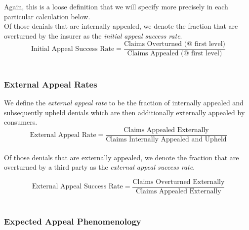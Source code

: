 \documentclass[psamsfonts]{amsart}
\theoremstyle{plain}
\theoremstyle{definition}
\theoremstyle{remark}
\begin{document}
Again, this is a loose definition that we will specify more precisely in each particular calculation below.\\

Of those denials that are internally appealed, we denote the fraction that are overturned by the insurer as the \emph{initial appeal success rate}.\\
	
\begin{equation*}
	\text{Initial Appeal Success Rate} = \dfrac{\text{Claims Overturned (@ first level)}}{\text{Claims Appealed (@ first level)}}
\end{equation*}
\hfill\\
	

\subsubsection{External Appeal Rates}

We define the \emph{external appeal rate} to be the fraction of internally appealed and subsequently upheld denials which are then additionally externally appealed by consumers.\\

\begin{equation*}
	\text{External Appeal Rate} = \dfrac{\text{Claims Appealed Externally}}{\text{Claims Internally Appealed and Upheld}}
\end{equation*}
\hfill\\


Of those denials that are externally appealed, we denote the fraction that are overturned by a third party as the \emph{external appeal success rate}.

\begin{equation*}
	\text{External Appeal Success Rate} = \dfrac{\text{Claims Overturned Externally}}{\text{Claims Appealed Externally}}
\end{equation*}
\hfill\\


\subsubsection{Expected Appeal Phenomenology}
\end{document}

